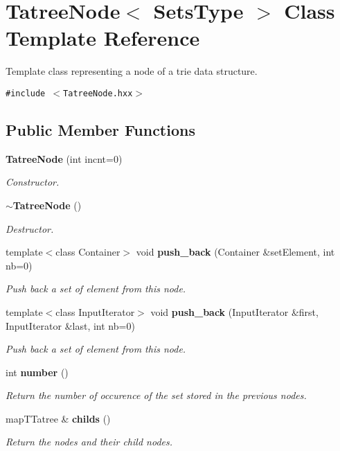 \section{Tatree\-Node$<$ Sets\-Type $>$ Class Template Reference}
\label{class_tatree_node}
Template class representing a node of a trie data structure.  


{\tt \#include $<$Tatree\-Node.hxx$>$}

\subsection*{Public Member Functions}
\begin{CompactItemize}
\item 
{\bf Tatree\-Node} (int incnt=0)\label{class_tatree_node_c1d3bb5eb337c148e101f300efa0719d}

\begin{CompactList}\small\item\em Constructor. \item\end{CompactList}\item 
{\bf $\sim$Tatree\-Node} ()\label{class_tatree_node_f6971420a5eedc158eafbfca2115cb17}

\begin{CompactList}\small\item\em Destructor. \item\end{CompactList}\item 
template$<$class Container$>$ void {\bf push\_\-back} (Container \&set\-Element, int nb=0)
\begin{CompactList}\small\item\em Push back a set of element from this node. \item\end{CompactList}\item 
template$<$class Input\-Iterator$>$ void {\bf push\_\-back} (Input\-Iterator \&first, Input\-Iterator \&last, int nb=0)
\begin{CompactList}\small\item\em Push back a set of element from this node. \item\end{CompactList}\item 
int {\bf number} ()\label{class_tatree_node_09aa679da0752a8f7881fb1d43e492af}

\begin{CompactList}\small\item\em Return the number of occurence of the set stored in the previous nodes. \item\end{CompactList}\item 
map\-TTatree \& {\bf childs} ()\label{class_tatree_node_77117d3078d2d307be2e7ef7e3bdc939}

\begin{CompactList}\small\item\em Return the nodes and their child nodes. \item\end{CompactList}\end{CompactItemize}
